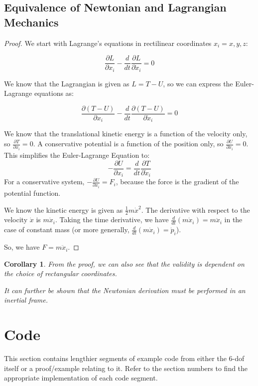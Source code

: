 \documentclass[12pt]{report}
\newtheorem{corollary}{Corollary}[theorem]
\begin{document}
\subsection{Equivalence of Newtonian and Lagrangian Mechanics}\label{equiv newt and lang}

\begin{proof}
We start with Lagrange's equations in rectilinear coordinates $x_i=x,y,z$:

$$\frac{\partial L}{\partial x_i}-\frac{d}{dt}\frac{\partial L}{\partial \dot{x}_i}=0 $$

We know that the \gls{Lagrangian} is given as $L=T-U$, so we can express the Euler-Lagrange equations as:

$$\frac{\partial (T-U)}{\partial x_i}-\frac{d}{dt}\frac{\partial (T-U)}{\partial \dot{x}_i}=0$$

We know that the translational kinetic energy is a function of the velocity only, so $\frac{\partial T}{\partial x_i}=0$. A conservative potential is a function of the position only, so $\frac{\partial U}{\partial \dot{x}_i}=0$. This simplifies the Euler-Lagrange Equation to:
$$-\frac{\partial U}{\partial x_i}=\frac{d}{dt}\frac{\partial T}{\partial \dot{x}_i}$$
For a conservative system, $-\frac{\partial U}{\partial x_i}=F_i$, because the force is the gradient of the potential function.

We know the kinetic energy is given as $\frac{1}{2}m\dot{x}^2$. The derivative with respect to the velocity $\dot{x}$ is $m\dot{x}_i$. Taking the time derivative, we have $\frac{d}{dt}(m\dot{x}_i)=m\ddot{x}_i$ in the case of constant mass (or more generally,  $\frac{d}{dt}(m\dot{x}_i)=\dot{p}_i$).

So, we have $F=m\ddot{x}_i$.

\end{proof}
\begin{corollary}
    From the proof, we can also see that the validity is dependent on the choice of rectangular coordinates. 

    It can further be shown that the Newtonian derivation must be performed in an inertial frame.
\end{corollary}


\section{Code}
This section contains lengthier segments of example code from either the 6-\gls{dof} itself or a proof/example relating to it. Refer to the section numbers to find the appropriate implementation of each code segment.
\end{document}
